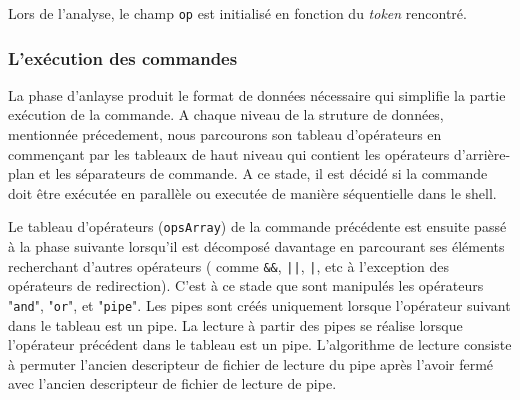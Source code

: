\documentclass[12pt]{article}
\begin{document}
Lors de l'analyse, le champ \texttt{op} est initialisé en fonction du \textit{token} rencontré.

\subsubsection{L'exécution des commandes}
La phase d'anlayse produit le format de données nécessaire qui simplifie la partie exécution de la commande. A chaque niveau de la struture de données, mentionnée précedement, nous parcourons son tableau d'opérateurs en commençant par les tableaux de haut niveau qui contient les opérateurs d'arrière-plan et les séparateurs de commande. A ce stade, il est décidé si la commande doit être exécutée en parallèle ou executée de manière séquentielle dans le shell.

Le tableau d'opérateurs (\texttt{opsArray}) de la commande précédente est ensuite passé à la phase suivante lorsqu'il est décomposé davantage en parcourant ses éléments recherchant d'autres opérateurs ( comme \texttt{\&\&}, \texttt{||}, \texttt{|}, etc à l'exception des opérateurs de redirection). C'est à ce stade que sont manipulés les opérateurs "\texttt{and}", "\texttt{or}", et "\texttt{pipe}". Les pipes sont créés uniquement lorsque l'opérateur suivant dans le tableau est un pipe. La lecture à partir des pipes se réalise lorsque l'opérateur précédent dans le tableau est un pipe. L'algorithme de lecture consiste à permuter l'ancien descripteur de fichier de lecture du pipe après l'avoir fermé avec l'ancien descripteur de fichier de lecture de pipe.
\end{document}
